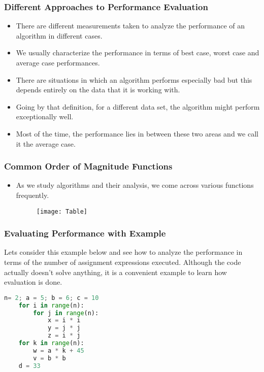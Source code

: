\documentclass{beamer}
\begin{document}
\begin{frame}
\frametitle{Different Approaches to Performance Evaluation}
\begin{itemize}
\item There are different measurements taken to analyze the performance of an algorithm in different cases.
\item We usually characterize the performance in terms of best case, worst case and average case performances.
\item There are situations in which an algorithm performs especially bad but this depends entirely on the data that it is working with.
\item Going by that definition, for a different data set, the algorithm might perform exceptionally well.
\item Most of the time, the performance lies in between these two areas and we call it the average case.
\end{itemize}
\end{frame}

\begin{frame}
\frametitle{Common Order of Magnitude Functions}
\begin{itemize}
\item As we study algorithms and their analysis, we come across various functions frequently.
\begin{figure}
\texttt{[image: Table]}
\end{figure}
\end{itemize}
\end{frame}


\begin{frame}[fragile]
\frametitle{Evaluating Performance with Example}
Lets consider this example below and see how to analyze the performance in terms of the number of assignment expressions executed.
Although the code actually doesn't solve anything, it is a convenient example to learn how evaluation is done.
\begin{lstlisting}[language=Python]
    n= 2; a = 5; b = 6; c = 10
    for i in range(n):
        for j in range(n):
            x = i * i
            y = j * j
            z = i * j
    for k in range(n):
        w = a * k + 45
        v = b * b
    d = 33
\end{lstlisting}
\end{frame}
\end{document}
